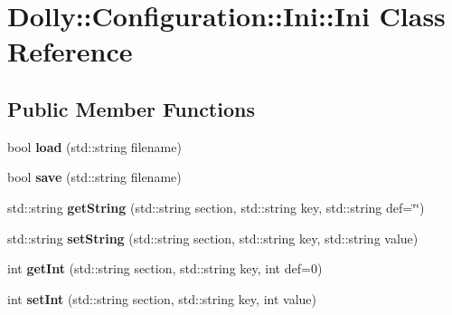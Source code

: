 \hypertarget{class_dolly_1_1_configuration_1_1_ini_1_1_ini}{}\section{Dolly\+:\+:Configuration\+:\+:Ini\+:\+:Ini Class Reference}
\label{class_dolly_1_1_configuration_1_1_ini_1_1_ini}
\subsection*{Public Member Functions}
\begin{DoxyCompactItemize}
\item 
\mbox{\label{class_dolly_1_1_configuration_1_1_ini_1_1_ini_ae940130be35589c79fd51168a5d0663b}} 
bool {\bfseries load} (std\+::string filename)
\item 
\mbox{\label{class_dolly_1_1_configuration_1_1_ini_1_1_ini_a99054a175e46d5196ee5c413faf95d7b}} 
bool {\bfseries save} (std\+::string filename)
\item 
\mbox{\label{class_dolly_1_1_configuration_1_1_ini_1_1_ini_a9716c9ce77c40ace2ddae3d43ca35c1d}} 
std\+::string {\bfseries get\+String} (std\+::string section, std\+::string key, std\+::string def=\char`\"{}\char`\"{})
\item 
\mbox{\label{class_dolly_1_1_configuration_1_1_ini_1_1_ini_aa16c9294c9dd39e8f1b65e6bf31d69b4}} 
std\+::string {\bfseries set\+String} (std\+::string section, std\+::string key, std\+::string value)
\item 
\mbox{\label{class_dolly_1_1_configuration_1_1_ini_1_1_ini_acbc9b294fdc7c93be44e6e1cead00534}} 
int {\bfseries get\+Int} (std\+::string section, std\+::string key, int def=0)
\item 
\mbox{\label{class_dolly_1_1_configuration_1_1_ini_1_1_ini_a2d050e9c42ece6964d00ae4fef344dc7}} 
int {\bfseries set\+Int} (std\+::string section, std\+::string key, int value)
\item 

\end{DoxyCompactItemize}
